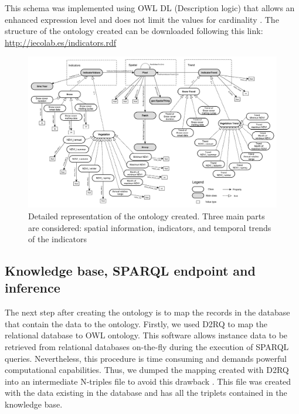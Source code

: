 This schema was implemented using OWL DL (Description logic) that allows an enhanced expression level and does not limit the values for cardinality \autocite{Smithetal2004OWLWeb}. The structure of the ontology created can be downloaded following this link: \url{http://iecolab.es/indicators.rdf}

\begin{figure}
\centering
    \includegraphics[width=\textwidth]{img/onto/onto-ontology}\caption{Detailed representation of the ontology created. Three main parts are considered:  spatial information, indicators, and temporal trends of the indicators}\label{fig:onto:ontology}
\end{figure}

\subsection{Knowledge base, SPARQL endpoint and inference}\label{sec:onto:SPARQL}

The next step after creating the ontology is to map the records in the database that contain the data to the ontology. Firstly, we used D2RQ \autocite{Bizeretal2004D2RQTreating} to map the relational database to OWL ontology. This software allows instance data to be retrieved from relational databases on-the-fly during the execution of SPARQL queries. Nevertheless, this procedure is time consuming and demands powerful computational capabilities. Thus, we dumped the mapping created with D2RQ into an intermediate N-triples file to avoid this drawback \autocite{Sarkaretal2011LinkedData}. This file was created with the data existing in the database and has all the triplets contained in the knowledge base.

